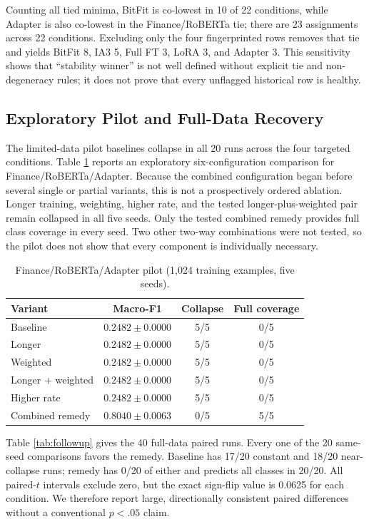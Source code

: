 \documentclass{SPC}
\begin{document}
Counting all tied minima, BitFit is co-lowest in 10 of 22 conditions, while Adapter is also co-lowest in the Finance/RoBERTa tie; there are 23 assignments across 22 conditions. Excluding only the four fingerprinted rows removes that tie and yields BitFit 8, IA3 5, Full FT 3, LoRA 3, and Adapter 3. This sensitivity shows that ``stability winner'' is not well defined without explicit tie and non-degeneracy rules; it does not prove that every unflagged historical row is healthy.

\subsection{Exploratory Pilot and Full-Data Recovery}

The limited-data pilot baselines collapse in all 20 runs across the four targeted conditions. Table \ref{tab:pilot} reports an exploratory six-configuration comparison for Finance/RoBERTa/Adapter. Because the combined configuration began before several single or partial variants, this is not a prospectively ordered ablation. Longer training, weighting, higher rate, and the tested longer-plus-weighted pair remain collapsed in all five seeds. Only the tested combined remedy provides full class coverage in every seed. Two other two-way combinations were not tested, so the pilot does not show that every component is individually necessary.

\begin{table}[!t]
\caption{Finance/RoBERTa/Adapter pilot (1,024 training examples, five seeds).}
\label{tab:pilot}
\centering
\scriptsize
\setlength{\tabcolsep}{3pt}
\begin{tabular}{lccc}
\toprule
Variant & Macro-F1 & Collapse & Full coverage \\
\midrule
Baseline & $0.2482\pm0.0000$ & 5/5 & 0/5 \\
Longer & $0.2482\pm0.0000$ & 5/5 & 0/5 \\
Weighted & $0.2482\pm0.0000$ & 5/5 & 0/5 \\
Longer + weighted & $0.2482\pm0.0000$ & 5/5 & 0/5 \\
Higher rate & $0.2482\pm0.0000$ & 5/5 & 0/5 \\
Combined remedy & $0.8040\pm0.0063$ & 0/5 & 5/5 \\
\bottomrule
\end{tabular}
\end{table}

Table \ref{tab:followup} gives the 40 full-data paired runs. Every one of the 20 same-seed comparisons favors the remedy. Baseline has 17/20 constant and 18/20 near-collapse runs; remedy has 0/20 of either and predicts all classes in 20/20. All paired-$t$ intervals exclude zero, but the exact sign-flip value is 0.0625 for each condition. We therefore report large, directionally consistent paired differences without a conventional $p<.05$ claim.
\end{document}
